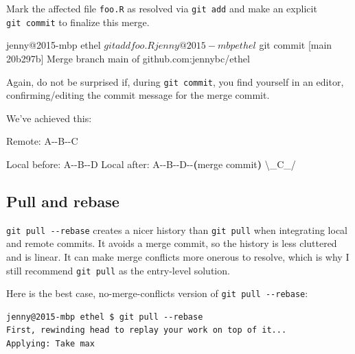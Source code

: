 \documentclass[
]{book}
\newenvironment{Shaded}{\begin{snugshade}}{\end{snugshade}}
\newcommand{\ErrorTok}[1]{\textcolor[rgb]{0.64,0.00,0.00}{\textbf{#1}}}
\newcommand{\ExtensionTok}[1]{#1}
\newcommand{\KeywordTok}[1]{\textcolor[rgb]{0.13,0.29,0.53}{\textbf{#1}}}
\newcommand{\NormalTok}[1]{#1}
\newcommand{\StringTok}[1]{\textcolor[rgb]{0.31,0.60,0.02}{#1}}
\begin{document}
Mark the affected file \texttt{foo.R} as resolved via \texttt{git\ add} and make an explicit \texttt{git\ commit} to finalize this merge.

\begin{Shaded}
\begin{Highlighting}[]
\ExtensionTok{jenny@2015{-}mbp}\NormalTok{ ethel $ git add foo.R}
\ExtensionTok{jenny@2015{-}mbp}\NormalTok{ ethel $ git commit}
\ExtensionTok{[main}\NormalTok{ 20b297b] Merge branch }\StringTok{\textquotesingle{}main\textquotesingle{}}\NormalTok{ of github.com:jennybc/ethel}
\end{Highlighting}
\end{Shaded}

Again, do not be surprised if, during \texttt{git\ commit}, you find yourself in an editor, confirming/editing the commit message for the merge commit.

We've achieved this:

\begin{Shaded}
\begin{Highlighting}[]
      \ExtensionTok{Remote:}\NormalTok{ A{-}{-}B{-}{-}C}

\ExtensionTok{Local}\NormalTok{ before: A{-}{-}B{-}{-}D}
 \ExtensionTok{Local}\NormalTok{ after: A{-}{-}B{-}{-}D{-}{-}}\ErrorTok{(}\ExtensionTok{merge}\NormalTok{ commit}\KeywordTok{)}
                  \ExtensionTok{\textbackslash{}\_C\_/}
\end{Highlighting}
\end{Shaded}

\subsection{Pull and rebase}\label{pull-and-rebase}

\texttt{git\ pull\ -\/-rebase} creates a nicer history than \texttt{git\ pull} when integrating local and remote commits. It avoids a merge commit, so the history is less cluttered and is linear. It can make merge conflicts more onerous to resolve, which is why I still recommend \texttt{git\ pull} as the entry-level solution.

Here is the best case, no-merge-conflicts version of \texttt{git\ pull\ -\/-rebase}:

\begin{verbatim}
jenny@2015-mbp ethel $ git pull --rebase
First, rewinding head to replay your work on top of it...
Applying: Take max
\end{verbatim}
\end{document}
